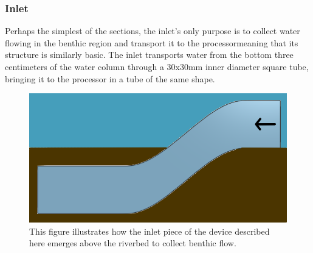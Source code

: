 \documentclass[fleqn,10pt]{SelfArx} %
\begin{document}
	\subsubsection{Inlet}
	Perhaps the simplest of the sections, the inlet’s only purpose is to collect water flowing in the \gls{benthic} region and transport it to the processor\textemdash meaning that its structure is similarly basic. The inlet transports water from the bottom three centimeters of the water column through a 30x30mm inner diameter square tube, bringing it to the processor in a tube of the same shape.
	
	\begin{figure}[h]
		\centering
		\includegraphics[width=1\linewidth]{Figures/InletInSitu}
		\caption[Inlet 2D Model]{This figure illustrates how the inlet piece of the device described here emerges above the riverbed to collect \gls{benthic} flow.}
		\label{fig:InletInSitu}
	\end{figure}
	
\end{document}
